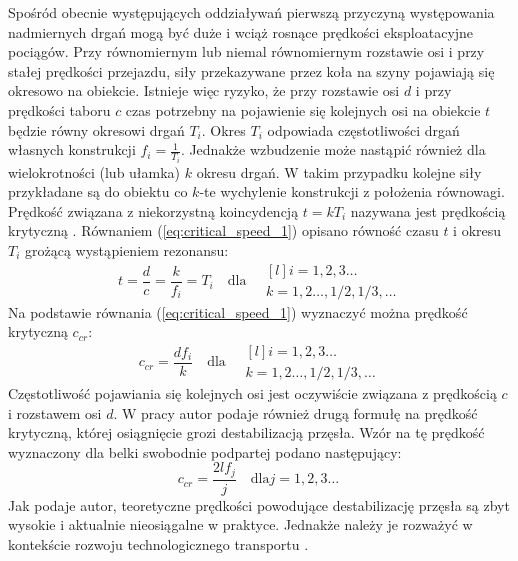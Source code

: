 Spośród obecnie występujących oddziaływań pierwszą przyczyną występowania nadmiernych drgań mogą być duże i wciąż rosnące prędkości eksploatacyjne pociągów. Przy równomiernym lub niemal równomiernym rozstawie osi i przy stałej prędkości przejazdu, siły przekazywane przez koła na szyny pojawiają się okresowo na obiekcie. Istnieje więc ryzyko, że przy rozstawie osi $d$ i przy prędkości taboru $c$ czas potrzebny na pojawienie się kolejnych osi na obiekcie $t$ będzie równy okresowi drgań $T_i$. Okres $T_i$ odpowiada częstotliwości drgań własnych konstrukcji $f_i=\frac{1}{T_i}$. Jednakże wzbudzenie może nastąpić również dla wielokrotności (lub ułamka) $k$ okresu drgań. W takim przypadku kolejne siły przykładane są do obiektu co $k$-te wychylenie konstrukcji z położenia równowagi. Prędkość związana z niekorzystną koincydencją $t=kT_i$ nazywana jest prędkością krytyczną . Równaniem (\ref{eq:critical_speed_1}) opisano równość czasu $t$ i okresu $T_i$ grożącą wystąpieniem rezonansu:
\begin{equation} \label{eq:critical_speed_1}
	t=\frac{d}{c}=\frac{k}{f_i}=T_i \quad\text{dla}\quad
	\begin{matrix*}[l]
		i=1,2,3\dots\ \\
		k=1,2\dots,1/2,1/3,\dots
	\end{matrix*}
\end{equation}
Na podstawie równania (\ref{eq:critical_speed_1}) wyznaczyć można prędkość krytyczną $c_{cr}$:
\begin{equation} \label{eq:critical_speed_2}
	c_{cr}=\frac{df_i}{k}\quad \text{dla}\quad
	\begin{matrix*}[l]
		i=1,2,3\dots\ \\
		k=1,2\dots,1/2,1/3,\dots
	\end{matrix*}
\end{equation}
Częstotliwość pojawiania się kolejnych osi jest oczywiście związana z prędkością $c$ i rozstawem osi $d$. W pracy \cite{Fryba2001} autor podaje również drugą formułę na prędkość krytyczną, której osiągnięcie grozi destabilizacją przęsła. Wzór na tę prędkość wyznaczony dla belki swobodnie podpartej podano następujący:
\begin{equation} \label{eq:criticla_speed}
	c_{cr}=\frac{2lf_j}{j}\quad\text{dla}j=1,2,3\dots\ 
\end{equation}
Jak podaje autor, teoretyczne prędkości powodujące destabilizację przęsła są zbyt wysokie i aktualnie nieosiągalne w praktyce. Jednakże należy je rozważyć w kontekście rozwoju technologicznego transportu \parencite{Ladislav2008}.

